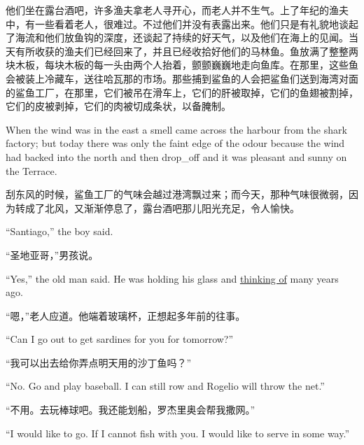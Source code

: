 \begin{paracol}{2}
\switchcolumn

他们坐在露台酒吧，许多渔夫拿老人寻开心，而老人并不生气。上了年纪的渔夫中，有一些看着老人，很难过。不过他们并没有表露出来。他们只是有礼貌地谈起了海流和他们放鱼钩的深度，还谈起了持续的好天气，以及他们在海上的见闻。当天有所收获的渔夫们已经回来了，并且已经收拾好他们的马林鱼。鱼放满了整整两块木板，每块木板的每一头由两个人抬着，颤颤巍巍地走向鱼库。在那里，这些鱼会被装上冷藏车，送往哈瓦那的市场。那些捕到鲨鱼的人会把鲨鱼们送到海湾对面的鲨鱼工厂，在那里，它们被吊在滑车上，它们的肝被取掉，它们的鱼翅被割掉，它们的皮被剥掉，它们的肉被切成条状，以备腌制。

\switchcolumn*

When the wind was in the east a smell came across the \gls{harbour} from the
shark factory; but today there was only the \gls{faint} \gls{edge} of the
\gls{odour} because the wind had backed into the north and then \gls{drop_off}
and it was \gls{pleasant} and sunny on the Terrace.

\switchcolumn

刮东风的时候，鲨鱼工厂的气味会越过港湾飘过来；而今天，那种气味很微弱，因为转成了北风，又渐渐停息了，露台酒吧那儿阳光充足，令人愉快。

\switchcolumn*

``Santiago,'' the boy said.

\switchcolumn

“圣地亚哥，”男孩说。

\switchcolumn*

``Yes,'' the old man said. He was holding his glass and \uline{thinking of}
many years ago.

\switchcolumn

“嗯，”老人应道。他端着玻璃杯，正想起多年前的往事。

\switchcolumn*

``Can I go out to get \glspl{sardine} for you for tomorrow?''

\switchcolumn

“我可以出去给你弄点明天用的沙丁鱼吗？”

\switchcolumn*

``No. Go and play baseball. I can \gls{still} \gls{row} and Rogelio will \gls{throw} the net.''

\switchcolumn

“不用。去玩棒球吧。我还能划船，罗杰里奥会帮我撒网。”

\switchcolumn*

``I would like to go. If I cannot fish with you. I would like to \gls{serve} in some way.''


\end{paracol}
